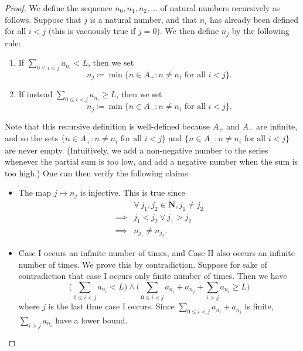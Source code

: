 \begin{proof}
    We define the sequence \(n_0, n_1, n_2, \dots\) of natural numbers recursively as follows.
    Suppose that \(j\) is a natural number, and that \(n_i\) has already been defined for all \(i < j\) (this is vacuously true if \(j = 0\)).
    We then define \(n_j\) by the following rule:
    \begin{enumerate}[label=(\Roman*)]
        \item If \(\sum_{0 \leq i < j} a_{n_i} < L\), then we set
              \[
                  n_j \coloneqq \min\{n \in A_+ : n \neq n_i \text{ for all } i < j\}.
              \]
        \item If instead \(\sum_{0 \leq i < j} a_{n_i} \geq L\), then we set
              \[
                  n_j \coloneqq \min\{n \in A_- : n \neq n_i \text{ for all } i < j\}.
              \]
    \end{enumerate}
    Note that this recursive definition is well-defined because \(A_+\) and \(A_-\) are infinite, and so the sets \(\{n \in A_+ : n \neq n_i \text{ for all } i < j\}\) and \(\{n \in A_- : n \neq n_i \text{ for all } i < j\}\) are never empty.
    (Intuitively, we add a non-negative number to the series whenever the partial sum is too low, and add a negative number when the sum is too high.)
    One can then verify the following claims:
    \begin{itemize}
        \item The map \(j \mapsto n_j\) is injective.
              This is true since
              \begin{align*}
                           & \forall\ j_1, j_2 \in \mathbf{N}, j_1 \neq j_2 \\
                  \implies & j_1 < j_2 \lor j_1 > j_2                       \\
                  \implies & n_{j_1} \neq n_{j_2}.
              \end{align*}
        \item Case I occurs an infinite number of times, and Case II also occurs an infinite number of times.
              We prove this by contradiction.
              Suppose for sake of contradiction that case I occurs only finite number of times.
              Then we have
              \[
                  \Bigg(\sum_{0 \leq i < j} a_{n_i} < L\Bigg) \land \Bigg(\sum_{0 \leq i < j} a_{n_i} + a_{n_j} + \sum_{i > j} a_{n_i} \geq L\Bigg)
              \]
              where \(j\) is the last time case I occurs.
              Since \(\sum_{0 \leq i < j} a_{n_i} + a_{n_j}\) is finite, \(\sum_{i > j} a_{n_i}\) have a lower bound.

\end{itemize}
\end{proof}
